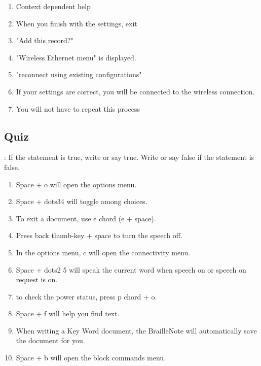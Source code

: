 \documentclass[10pt,letterpaper,twoside]{report}
\begin{document}
{\begin{enumerate}
	      \begin{itemize}\item if I did change to "yes" other fields and choices would become available.
	      \end{itemize}
	\item Context dependent help 
	\item When you finish with the settings, exit 
	\item "Add this record?" 
	\item "Wireless Ethernet menu" is displayed.
	\item "reconnect using existing configurations" 
	\item If your settings are correct, you will be connected to the wireless connection.
	\item You will not have to repeat this process
\end{enumerate}
\clearpage 
\subsection{Quiz}:
If the statement is true, write or say true. Write or say false if the statement is false.
\begin{enumerate}
	\item Space + o will open the options menu.
	\item Space + dots34  will toggle among choices.
	\item To exit a document, use e chord (e + space).
	\item Press back thumb-key + space to turn the speech off.
	\item In the options menu, c will open the connectivity menu.
	\item Space + dots2 5 will speak the current word when speech on or speech on request is on.
	\item to check the power status, press p chord + o.
	\item Space + f will help you find text.
	\item When writing a Key Word document, the BrailleNote will automatically save the document for you.
	\item Space + b will open the block commands menu.
\end{enumerate}

}
\end{document}
